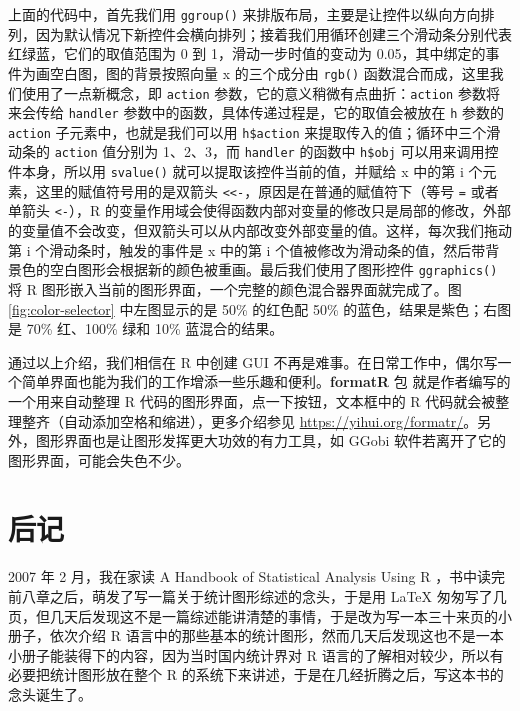 \documentclass[
  b5paper,
  UTF8,twoside]{book}
\begin{document}
上面的代码中，首先我们用 \texttt{ggroup()} 来排版布局，主要是让控件以纵向方向排列，因为默认情况下新控件会横向排列；接着我们用循环创建三个滑动条分别代表红绿蓝，它们的取值范围为 0 到 1，滑动一步时值的变动为 0.05，其中绑定的事件为画空白图，图的背景按照向量 x 的三个成分由 \texttt{rgb()} 函数混合而成，这里我们使用了一点新概念，即 \texttt{action} 参数，它的意义稍微有点曲折：\texttt{action} 参数将来会传给 \texttt{handler} 参数中的函数，具体传递过程是，它的取值会被放在 \texttt{h} 参数的 \texttt{action} 子元素中，也就是我们可以用 \texttt{h\$action} 来提取传入的值；循环中三个滑动条的 \texttt{action} 值分别为 1、2、3，而 \texttt{handler} 的函数中 \texttt{h\$obj} 可以用来调用控件本身，所以用 \texttt{svalue()} 就可以提取该控件当前的值，并赋给 x 中的第 i 个元素，这里的赋值符号用的是双箭头 \texttt{\textless{}\textless{}-}，原因是在普通的赋值符下（等号 \texttt{=} 或者单箭头 \texttt{\textless{}-}），R 的变量作用域会使得函数内部对变量的修改只是局部的修改，外部的变量值不会改变，但双箭头可以从内部改变外部变量的值。这样，每次我们拖动第 i 个滑动条时，触发的事件是 x 中的第 i 个值被修改为滑动条的值，然后带背景色的空白图形会根据新的颜色被重画。最后我们使用了图形控件 \texttt{ggraphics()} 将 R 图形嵌入当前的图形界面，一个完整的颜色混合器界面就完成了。图 \ref{fig:color-selector} 中左图显示的是 50\% 的红色配 50\% 的蓝色，结果是紫色；右图是 70\% 红、100\% 绿和 10\% 蓝混合的结果。

通过以上介绍，我们相信在 R 中创建 GUI 不再是难事。在日常工作中，偶尔写一个简单界面也能为我们的工作增添一些乐趣和便利。\textbf{formatR} 包 \citep{formatR} 就是作者编写的一个用来自动整理 R 代码的图形界面，点一下按钮，文本框中的 R 代码就会被整理整齐（自动添加空格和缩进），更多介绍参见 \url{https://yihui.org/formatr/}。另外，图形界面也是让图形发挥更大功效的有力工具，如 GGobi 软件若离开了它的图形界面，可能会失色不少。

\hypertarget{postscript}{%
\chapter{后记}\label{postscript}}

2007 年 2 月，我在家读 A Handbook of Statistical Analysis Using R \citep{Everitt06}，书中读完前八章之后，萌发了写一篇关于统计图形综述的念头，于是用 LaTeX 匆匆写了几页，但几天后发现这不是一篇综述能讲清楚的事情，于是改为写一本三十来页的小册子，依次介绍 R 语言中的那些基本的统计图形，然而几天后发现这也不是一本小册子能装得下的内容，因为当时国内统计界对 R 语言的了解相对较少，所以有必要把统计图形放在整个 R 的系统下来讲述，于是在几经折腾之后，写这本书的念头诞生了。
\end{document}
